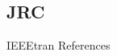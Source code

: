 \documentclass[conference]{IEEEtran}
\begin{document}
\begin{enumerate}
    
    
    
    
    \section {JRC}


	\end{enumerate}
	
	
	 {IEEEtran}
	 {References}
	
		
	
	
  
\end{document}
